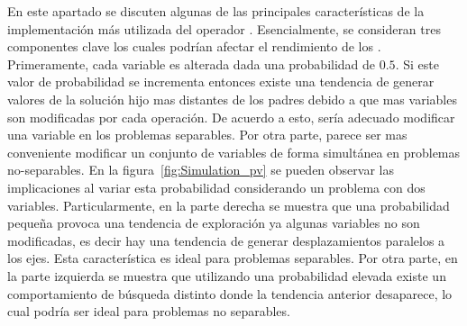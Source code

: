 En este apartado se discuten algunas de las principales características de la implementación más utilizada del operador \SBX{}.
%
Esencialmente, se consideran tres componentes clave los cuales podrían afectar el rendimiento de los \MOEAS{}.
%
Primeramente, cada variable es alterada dada una probabilidad de $0.5$.
%
Si este valor de probabilidad se incrementa entonces existe una tendencia de generar valores de la solución hijo mas distantes de los padres debido a que mas variables son modificadas por cada operación.
%
De acuerdo a esto, sería adecuado modificar una variable en los problemas separables.
%
Por otra parte, parece ser mas conveniente modificar un conjunto de variables de forma simultánea en problemas no-separables.
%
En la figura~\ref{fig:Simulation_pv} se pueden observar las implicaciones al variar esta probabilidad considerando un problema con dos variables.
%
Particularmente, en la parte derecha se muestra que una probabilidad pequeña provoca una tendencia de exploración ya algunas variables no son modificadas, es decir hay una tendencia de generar desplazamientos paralelos a los ejes.
%
Esta característica es ideal para problemas separables.
%
Por otra parte, en la parte izquierda se muestra que utilizando una probabilidad elevada existe un comportamiento de búsqueda distinto donde la tendencia anterior desaparece, lo cual podría ser ideal para problemas no separables.
